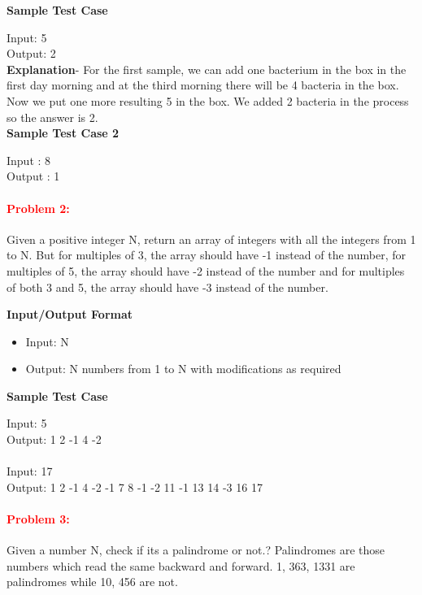 \documentclass[a4paper,11pt]{article} %
\begin{document}
\textbf{Sample Test Case}

Input: 5 \\
Output: 2\\

\textbf{Explanation}- For the first sample, we can add one bacterium in the box in the first day morning and at the third morning there will be 4 bacteria in the box. Now we put one more resulting 5 in the box. We added 2 bacteria in the process so the answer is 2.\\

\textbf{Sample Test Case 2}

Input : 8 \\
Output : 1 \\

\vspace*{0.3cm}

\paragraph{\textcolor{red}{Problem 2: }}
Given a positive integer N, return an array of integers with all the integers from 1 to N. But for multiples of 3, the array should have -1 instead of the number, for multiples of 5, the array should have -2 instead of the number and for multiples of both 3 and 5, the array should have -3 instead of the number.

\textbf{Input/Output Format}
\begin{itemize}
    \item  Input: N
    \item  Output: N numbers from 1 to N with modifications as required
\end{itemize}


\textbf{Sample Test Case}

Input: 5 \\
Output: 1 2 -1 4 -2\\
\\
Input: 17\\
Output: 1 2 -1 4 -2 -1 7 8 -1 -2 11 -1 13 14 -3 16 17

\vspace*{0.3cm}

\paragraph{\textcolor{red}{Problem 3: }}
Given a number N, check if its a palindrome or not.? Palindromes are those numbers which read the same backward and forward. 1, 363, 1331 are palindromes while 10, 456 are not.
\end{document}
